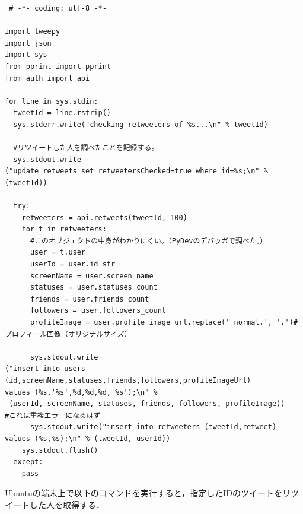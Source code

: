 \begin{verbatim}
 # -*- coding: utf-8 -*-

import tweepy
import json
import sys
from pprint import pprint
from auth import api

for line in sys.stdin:
  tweetId = line.rstrip()
  sys.stderr.write("checking retweeters of %s...\n" % tweetId)
  
  #リツイートした人を調べたことを記録する。
  sys.stdout.write
("update retweets set retweetersChecked=true where id=%s;\n" % (tweetId))
  
  try:
    retweeters = api.retweets(tweetId, 100)
    for t in retweeters:
      #このオブジェクトの中身がわかりにくい。（PyDevのデバッガで調べた。）
      user = t.user
      userId = user.id_str
      screenName = user.screen_name
      statuses = user.statuses_count
      friends = user.friends_count
      followers = user.followers_count
      profileImage = user.profile_image_url.replace('_normal.', '.')#プロフィール画像（オリジナルサイズ）
      
      sys.stdout.write
("insert into users (id,screenName,statuses,friends,followers,profileImageUrl)
values (%s,'%s',%d,%d,%d,'%s');\n" %
 (userId, screenName, statuses, friends, followers, profileImage))
#これは重複エラーになるはず
      sys.stdout.write("insert into retweeters (tweetId,retweet) 
values (%s,%s);\n" % (tweetId, userId))
    sys.stdout.flush()
  except:
    pass

\end{verbatim}

Ubuntuの端末上で以下のコマンドを実行すると，指定したIDのツイートをリツイートした人を取得する．


